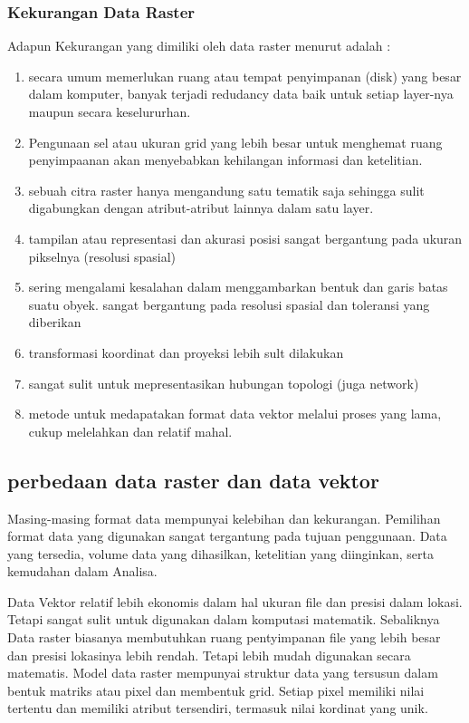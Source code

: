 \subsubsection{Kekurangan Data Raster}
Adapun Kekurangan yang dimiliki oleh data raster menurut \cite{irwansyah2013sistem} adalah :
	\begin{enumerate}
		\item secara umum memerlukan ruang atau tempat penyimpanan (disk) yang besar dalam komputer, banyak terjadi redudancy data baik untuk setiap layer-nya maupun secara keselururhan.
		\item Pengunaan sel atau ukuran grid yang lebih besar untuk menghemat ruang penyimpaanan akan menyebabkan kehilangan informasi dan ketelitian.
		\item sebuah citra raster hanya mengandung satu tematik saja sehingga sulit digabungkan dengan atribut-atribut lainnya dalam satu layer.
		\item tampilan atau representasi dan akurasi posisi sangat bergantung pada ukuran pikselnya (resolusi spasial)
		\item sering mengalami kesalahan dalam menggambarkan bentuk dan garis batas suatu obyek. sangat bergantung pada resolusi spasial dan toleransi yang diberikan
		\item transformasi koordinat dan proyeksi lebih sult dilakukan
		\item sangat sulit untuk mepresentasikan hubungan topologi (juga network)
		\item metode untuk medapatakan format data vektor melalui proses yang lama, cukup melelahkan dan relatif mahal.
	\end{enumerate}

\subsection{perbedaan data raster dan data vektor}
Masing-masing format data mempunyai kelebihan dan kekurangan.
Pemilihan format data yang digunakan sangat tergantung pada tujuan penggunaan. 
Data yang tersedia, volume data yang dihasilkan, ketelitian yang diinginkan, serta kemudahan dalam Analisa.

Data Vektor relatif lebih ekonomis dalam hal ukuran file dan presisi dalam lokasi. Tetapi sangat sulit untuk 
digunakan dalam komputasi matematik.
Sebaliknya Data raster biasanya membutuhkan ruang pentyimpanan file yang lebih besar dan presisi lokasinya lebih rendah.
Tetapi lebih mudah digunakan secara matematis.
Model data raster mempunyai struktur data yang tersusun dalam bentuk matriks atau pixel dan membentuk grid. 
Setiap pixel memiliki nilai tertentu dan memiliki atribut tersendiri, termasuk nilai kordinat yang unik.

